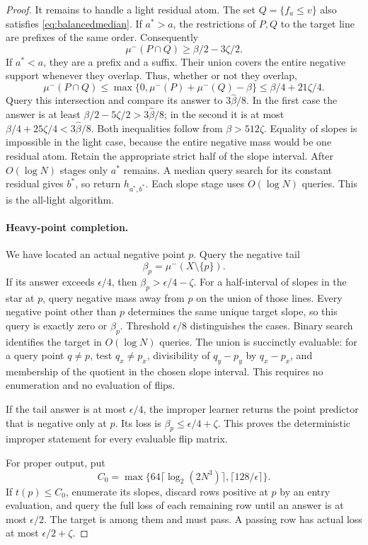 \documentclass[11pt]{article}
\newcommand{\1}{\mathbf 1}
\begin{document}
\begin{proof}
It remains to handle a light residual atom. The set $Q=\{f_a\le v\}$ also satisfies \eqref{eq:balancedmedian}. If $a^*>a$, the restrictions of $P,Q$ to the target line are prefixes of the same order. Consequently
\[
 \mu^-(P\cap Q)\ge\beta/2-3\zeta/2.
\]
If $a^*<a$, they are a prefix and a suffix. Their union covers the entire negative support whenever they overlap. Thus, whether or not they overlap,
\[
 \mu^-(P\cap Q)
 \le\max\{0,\mu^-(P)+\mu^-(Q)-\beta\}
 \le\beta/4+21\zeta/4.
\]
Query this intersection and compare its answer to $3\widehat\beta/8$. In the first case the answer is at least $\beta/2-5\zeta/2>3\widehat\beta/8$; in the second it is at most $\beta/4+25\zeta/4<3\widehat\beta/8$. Both inequalities follow from $\beta>512\zeta$. Equality of slopes is impossible in the light case, because the entire negative mass would be one residual atom. Retain the appropriate strict half of the slope interval. After $O(\log N)$ stages only $a^*$ remains. A median query search for its constant residual gives $b^*$, so return $h_{a^*,b^*}$. Each slope stage uses $O(\log N)$ queries. This is the all-light algorithm.

\paragraph{Heavy-point completion.}
We have located an actual negative point $p$. Query the negative tail
\[
 \beta_p=\mu^-(X\setminus\{p\}).
\]
If its answer exceeds $\epsilon/4$, then $\beta_p>\epsilon/4-\zeta$. For a half-interval of slopes in the star at $p$, query negative mass away from $p$ on the union of those lines. Every negative point other than $p$ determines the same unique target slope, so this query is exactly zero or $\beta_p$. Threshold $\epsilon/8$ distinguishes the cases. Binary search identifies the target in $O(\log N)$ queries. The union is succinctly evaluable: for a query point $q\ne p$, test $q_x\ne p_x$, divisibility of $q_y-p_y$ by $q_x-p_x$, and membership of the quotient in the chosen slope interval. This requires no enumeration and no evaluation of flips.

If the tail answer is at most $\epsilon/4$, the improper learner returns the point predictor that is negative only at $p$. Its loss is $\beta_p\le\epsilon/4+\zeta$. This proves the deterministic improper statement for every evaluable flip matrix.

For proper output, put
\[
 C_0=\max\{64\lceil\log_2(2N^3)\rceil,\lceil128/\epsilon\rceil\}.
\]
If $t(p)\le C_0$, enumerate its slopes, discard rows positive at $p$ by an entry evaluation, and query the full loss of each remaining row until an answer is at most $\epsilon/2$. The target is among them and must pass. A passing row has actual loss at most $\epsilon/2+\zeta$.


\end{proof}
\end{document}
